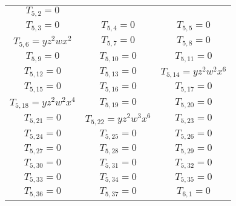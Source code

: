 \documentclass[12pt]{memoireuqam1.3}
\begin{document}
\begin{longtable}{|c|c|c|}
$T_{5,2}= 0$\\

$T_{5,3}= 0$&

$T_{5,4}= 0$&

$T_{5,5}= 0$\\

$T_{5,6}= yz^2wx^2$&

$T_{5,7}= 0$&

$T_{5,8}= 0$\\

$T_{5,9}= 0$&

$T_{5,10}= 0$&

$T_{5,11}= 0$\\

$T_{5,12}= 0$&

$T_{5,13}= 0$&

$T_{5,14}= yz^2w^2x^6$\\

$T_{5,15}= 0$&

$T_{5,16}= 0$&

$T_{5,17}= 0$\\

$T_{5,18}= yz^2w^2x^4$&

$T_{5,19}= 0$&

$T_{5,20}= 0$\\

$T_{5,21}= 0$&

$T_{5,22}= yz^2w^3x^6$&

$T_{5,23}= 0$\\

$T_{5,24}= 0$&

$T_{5,25}= 0$&

$T_{5,26}= 0$\\

$T_{5,27}= 0$&

$T_{5,28}= 0$&

$T_{5,29}= 0$\\

$T_{5,30}= 0$&

$T_{5,31}= 0$&

$T_{5,32}= 0$\\

$T_{5,33}= 0$&

$T_{5,34}= 0$&

$T_{5,35}= 0$\\

$T_{5,36}= 0$&

$T_{5,37}= 0$&

$T_{6,1}= 0$\\


\end{longtable}
\end{document}

